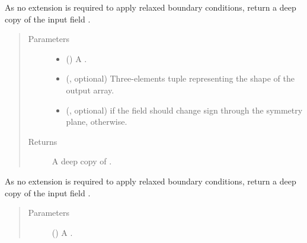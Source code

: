 \documentclass[letterpaper,10pt,english]{sphinxmanual}
\begin{document}
\begin{fulllineitems}
\begin{fulllineitems}
\label{\detokenize{api:dycore.horizontal_boundary.Relaxed.from_computational_to_physical_domain}}
As no extension is required to apply relaxed boundary conditions, return a deep copy of the
input field .
\begin{quote}\begin{description}
\item[{Parameters}] \leavevmode\begin{itemize}
\item {} 
 () \textendash{} A .

\item {} 
 (, optional) \textendash{} Three-elements tuple representing the shape of the output array.

\item {} 
 (, optional) \textendash{}  if the field should change sign through the symmetry plane,
 otherwise.

\end{itemize}

\item[{Returns}] \leavevmode
A deep copy of .

\end{description}\end{quote}

\end{fulllineitems}


\begin{fulllineitems}
\label{\detokenize{api:dycore.horizontal_boundary.Relaxed.from_physical_to_computational_domain}}
As no extension is required to apply relaxed boundary conditions, return a deep copy of the
input field .
\begin{quote}\begin{description}
\item[{Parameters}] \leavevmode
{} () \textendash{} A .


\end{description}
\end{quote}
\end{fulllineitems}
\end{fulllineitems}
\end{document}
